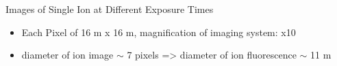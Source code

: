 \documentclass{beamer}
\begin{document}
\begin{frame}{Images of Single Ion at Different Exposure Times}

\begin{itemize}
\item Each Pixel of 16 \textmu m x 16 \textmu m, magnification of imaging system: x10
\bigskip
\item diameter of ion image $\sim$ 7 pixels => diameter of ion fluorescence $\sim$ 11 \textmu m

\end{itemize}


\begin{figure}
\centering
\renewcommand{\thesubfigure}{(a)}     
\renewcommand{\thesubfigure}{(b)}     
\renewcommand{\thesubfigure}{(c)}     
\end{figure}


\end{frame}
\end{document}
